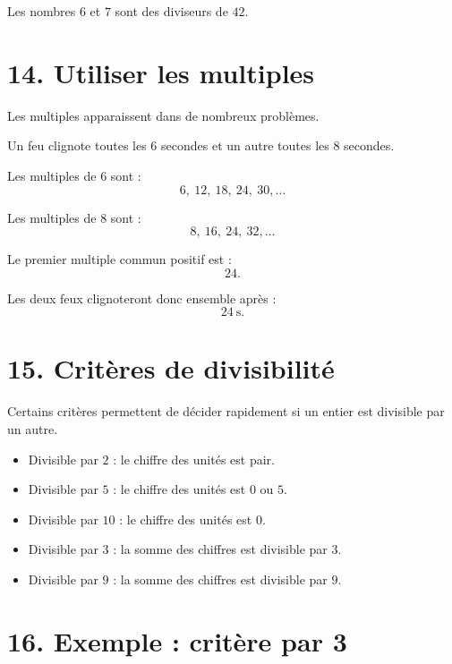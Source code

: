 Les nombres $6$ et $7$ sont des diviseurs de $42$.

\section{14. Utiliser les multiples}

Les multiples apparaissent dans de nombreux problèmes.

\begin{exemple}
Un feu clignote toutes les $6$ secondes et un autre toutes les $8$ secondes.

Les multiples de $6$ sont :
\[
6,\ 12,\ 18,\ 24,\ 30,\ldots
\]

Les multiples de $8$ sont :
\[
8,\ 16,\ 24,\ 32,\ldots
\]

Le premier multiple commun positif est :
\[
24.
\]

Les deux feux clignoteront donc ensemble après :
\[
\boxed{24\ \text{s}}.
\]
\end{exemple}

\section{15. Critères de divisibilité}

Certains critères permettent de décider rapidement si un entier est divisible par un autre.


\begin{itemize}
\item Divisible par $2$ : le chiffre des unités est pair.
\item Divisible par $5$ : le chiffre des unités est $0$ ou $5$.
\item Divisible par $10$ : le chiffre des unités est $0$.
\item Divisible par $3$ : la somme des chiffres est divisible par $3$.
\item Divisible par $9$ : la somme des chiffres est divisible par $9$.
\end{itemize}

\section{16. Exemple : critère par 3}

